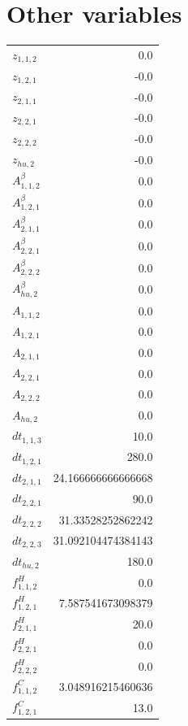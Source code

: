 \documentclass{article}%
\makeatletter
\let\mcnewpage=\newpage%
\newcommand{\TrickSupertabularIntoMulticols}{%
\renewcommand\newpage{%
\if@firstcolumn%
\hrule width\linewidth height0pt%
\columnbreak%
\else%
\mcnewpage%
\fi%
}%
}%
\makeatother
\begin{document}
\section{Other variables}%
\thispagestyle{plain}%
\begin{multicols*}{3}%
\TrickSupertabularIntoMulticols%
%
\begin{supertabular}{lr}%
	$z_{1,1,2}$ & 0.0 \\%
	$z_{1,2,1}$ & -0.0 \\%
	$z_{2,1,1}$ & -0.0 \\%
	$z_{2,2,1}$ & -0.0 \\%
	$z_{2,2,2}$ & -0.0 \\%
	$z_{hu,2}$ & -0.0 \\%
	$A_{1,1,2}^{\beta}$ & 0.0 \\%
	$A_{1,2,1}^{\beta}$ & 0.0 \\%
	$A_{2,1,1}^{\beta}$ & 0.0 \\%
	$A_{2,2,1}^{\beta}$ & 0.0 \\%
	$A_{2,2,2}^{\beta}$ & 0.0 \\%
	$A_{hu,2}^{\beta}$ & 0.0 \\%
	$A_{1,1,2}$ & 0.0 \\%
	$A_{1,2,1}$ & 0.0 \\%
	$A_{2,1,1}$ & 0.0 \\%
	$A_{2,2,1}$ & 0.0 \\%
	$A_{2,2,2}$ & 0.0 \\%
	$A_{hu,2}$ & 0.0 \\%
	$dt_{1,1,3}$ & 10.0 \\%
	$dt_{1,2,1}$ & 280.0 \\%
	$dt_{2,1,1}$ & 24.166666666666668 \\%
	$dt_{2,2,1}$ & 90.0 \\%
	$dt_{2,2,2}$ & 31.33528252862242 \\%
	$dt_{2,2,3}$ & 31.092104474384143 \\%
	$dt_{hu,2}$ & 180.0 \\%
	$f_{1,1,2}^{H}$ & 0.0 \\%
	$f_{1,2,1}^{H}$ & 7.587541673098379 \\%
	$f_{2,1,1}^{H}$ & 20.0 \\%
	$f_{2,2,1}^{H}$ & 0.0 \\%
	$f_{2,2,2}^{H}$ & 0.0 \\%
	$f_{1,1,2}^{C}$ & 3.048916215460636 \\%
	$f_{1,2,1}^{C}$ & 13.0 \\%

\end{supertabular}
\end{multicols*}
\end{document}
